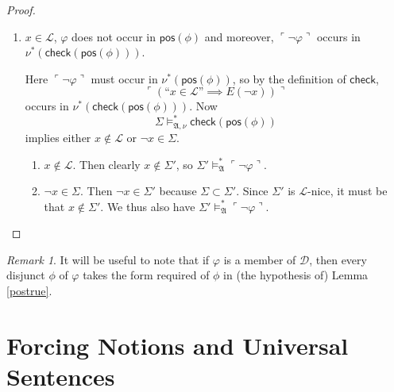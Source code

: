 \documentclass[12pt, twoside]{memoir}
\numberwithin{equation}{section}
\theoremstyle{definition}
\theoremstyle{remark}
\newtheorem{rem}[thm]{Remark}
\theoremstyle{definition}
\theoremstyle{definition}
\theoremstyle{definition}
\theoremstyle{remark}
\begin{document}
\begin{proof}
\begin{enumerate}[label=Case \arabic*:, leftmargin=50pt]
    If $\varphi$ occurs in $\nu^*(\mathsf{pos}(\phi))$ then by the same argument as in Case 2, $\Sigma \models^*_{\mathfrak{A}} \varphi$ and we have our desired conclusion. Otherwise, $\varphi$ occurs as a subformula of $\nu^*(\varphi')$ for some $\varphi'$ of the form $$\ulcorner (\text{``} x \in \mathcal{L} \text{''} \implies \text{``} E(\neg x) \text{''}) \urcorner \text{,}$$ where $x$ is a variable. By the fact that $$\Sigma \models^*_{\mathfrak{A}, \nu} \mathsf{check}(\mathsf{pos}(\phi)),$$ $\Sigma \models^*_{\mathfrak{A}} \ulcorner \neg \varphi \urcorner$ means $x \not \in \mathcal{L}$, in which case also $\Sigma' \models^*_{\mathfrak{A}} \ulcorner \neg \varphi \urcorner$.
    \item $x \in \mathcal{L}$, $\varphi$ does not occur in $\mathsf{pos}(\phi)$ and moreover, $\ulcorner \neg \varphi \urcorner$ occurs in \\ $\nu^*(\mathsf{check}(\mathsf{pos}(\phi)))$. 
    
    Here $\ulcorner \neg \varphi \urcorner$ must occur in $\nu^*(\mathsf{pos}(\phi))$, so by the definition of $\mathsf{check}$, $$\ulcorner (\text{``} x \in \mathcal{L} \text{''} \implies E(\neg x)) \urcorner$$ occurs in $\nu^*(\mathsf{check}(\mathsf{pos}(\phi)))$. Now $$\Sigma \models^*_{\mathfrak{A}, \nu} \mathsf{check}(\mathsf{pos}(\phi))$$ implies either $x \not \in \mathcal{L}$ or $\neg x \in \Sigma$. 
    \begin{enumerate}[label=Subcase \arabic*:, leftmargin=60pt]
        \item $x \not \in \mathcal{L}$. Then clearly $x \not \in \Sigma'$, so $\Sigma' \models^*_{\mathfrak{A}} \ulcorner \neg \varphi \urcorner$.
        \item $\neg x \in \Sigma$. Then $\neg x \in \Sigma'$ because $\Sigma \subset \Sigma'$. Since $\Sigma'$ is $\mathcal{L}$-nice, it must be that $x \not \in \Sigma'$. We thus also have $\Sigma' \models^*_{\mathfrak{A}} \ulcorner \neg \varphi \urcorner$. \qedhere
    \end{enumerate}
\end{enumerate}
\end{proof}

\begin{rem}\label{rem328}
It will be useful to note that if $\varphi$ is a member of $\mathcal{D}$, then every disjunct $\phi$ of $\varphi$ takes the form required of $\phi$ in (the hypothesis of) Lemma \ref{postrue}.
\end{rem}

\section{Forcing Notions and Universal Sentences}
\end{document}
